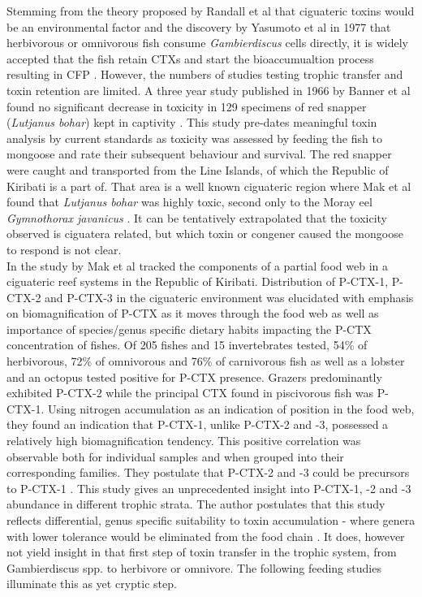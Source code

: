\documentclass[12pt]{article}
\begin{document}
Stemming from the theory proposed by Randall et al that ciguateric toxins would be an environmental factor and the discovery by Yasumoto et al in 1977 that herbivorous or omnivorous fish consume \emph{Gambierdiscus} cells directly, it is widely accepted that the fish retain CTXs and start the bioaccumualtion process resulting in CFP \cite{randall1958review,yasumoto1977finding}.
However, the numbers of studies testing trophic transfer and toxin retention are limited.
A three year study published in 1966 by Banner et al found no significant decrease in toxicity in 129 specimens of red snapper (\emph{Lutjanus bohar}) kept in captivity \cite{banner1966retention}. This study pre-dates meaningful toxin analysis by current standards as toxicity was assessed by feeding the fish to mongoose and rate their subsequent behaviour and survival. The red snapper were caught and transported from the Line Islands, of which the Republic of Kiribati is a part of. That area is a well known ciguateric region where Mak et al found that \emph{Lutjanus bohar} was highly toxic, second only to the Moray eel \emph{Gymnothorax javanicus} \cite{mak2013pacific}. It can be tentatively extrapolated that the toxicity observed is ciguatera related, but which toxin or congener caused the mongoose to respond is not clear. \\

In the study by Mak et al tracked the components of a partial food web in a ciguateric reef systems in the Republic of Kiribati. Distribution of P-CTX-1, P-CTX-2 and P-CTX-3 in the ciguateric environment was elucidated with emphasis on biomagnification of P-CTX as it moves through the food web as well as importance of species/genus specific dietary habits impacting the P-CTX concentration of fishes. Of 205 fishes and 15 invertebrates tested, 54\% of herbivorous, 72\% of omnivorous and 76\% of carnivorous fish as well as a lobster and an octopus tested positive for P-CTX presence. Grazers predominantly exhibited P-CTX-2 while the principal CTX found in piscivorous fish was P-CTX-1. Using nitrogen accumulation as an indication of position in the food web, they found an indication that P-CTX-1, unlike P-CTX-2 and -3, possessed a relatively high biomagnification tendency. This positive correlation was observable both for individual samples and when grouped into their corresponding families. They postulate that P-CTX-2 and -3 could be precursors to P-CTX-1 \cite{mak2013pacific}. This study gives an unprecedented insight into P-CTX-1, -2 and -3 abundance in different trophic strata. The author postulates that this study reflects differential, genus specific suitability to toxin accumulation - where genera with lower tolerance would be eliminated from the food chain \cite{makICHA}. It does, however not yield insight in that first step of toxin transfer in the trophic system, from Gambierdiscus spp. to herbivore or omnivore. The following feeding studies illuminate this as yet cryptic step. 
\end{document}

